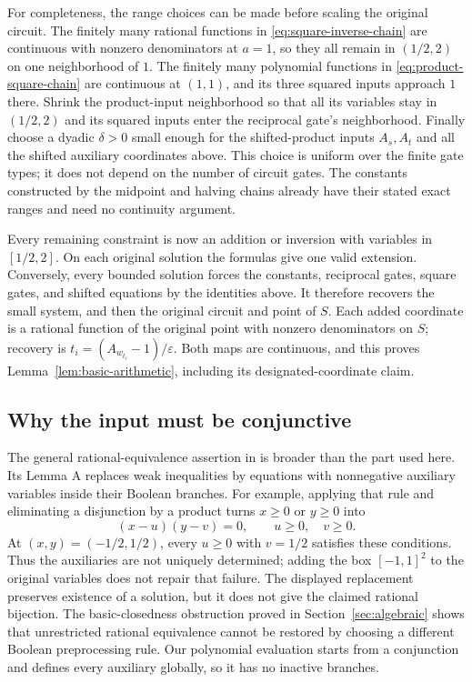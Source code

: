 For completeness, the range choices can be made before scaling the
original circuit. The finitely many rational functions in
\eqref{eq:square-inverse-chain} are continuous with nonzero denominators
at $a=1$, so they all remain in $(1/2,2)$ on one neighborhood of $1$.
The finitely many polynomial functions in
\eqref{eq:product-square-chain} are continuous at $(1,1)$, and its
three squared inputs approach $1$ there. Shrink the product-input
neighborhood so that all its variables stay in $(1/2,2)$ and its squared
inputs enter the reciprocal gate's neighborhood. Finally choose a dyadic
$\delta>0$ small enough for the shifted-product inputs $A_s,A_t$ and
all the shifted auxiliary coordinates above. This choice is uniform over
the finite gate types; it does not depend on the number of circuit gates.
The constants constructed by the midpoint and halving chains already
have their stated exact ranges and need no continuity argument.

Every remaining constraint is now an addition or inversion with variables
in $[1/2,2]$. On each original solution the formulas give one valid
extension. Conversely, every bounded solution forces the constants,
reciprocal gates, square gates, and shifted equations by the identities
above. It therefore recovers the small system, and then the original
circuit and point of $S$. Each added coordinate is a rational function
of the original point with nonzero denominators on $S$; recovery is
$t_i=(A_{w_{t_i}}-1)/\varepsilon$.
Both maps are continuous, and this proves
Lemma~\ref{lem:basic-arithmetic}, including its designated-coordinate claim.

\subsection{Why the input must be conjunctive}

The general rational-equivalence assertion in
\citet[Theorem 1]{AbrahamsenMiltzow2019} is broader than the part used
here. Its Lemma A replaces weak inequalities by equations with
nonnegative auxiliary variables inside their Boolean branches.
For example, applying that rule and eliminating a disjunction by a product
turns $x\ge0$ or $y\ge0$ into
\[
 (x-u)(y-v)=0,\qquad u\ge0,\quad v\ge0.
\]
At $(x,y)=(-1/2,1/2)$, every $u\ge0$ with $v=1/2$ satisfies these
conditions. Thus the auxiliaries are not uniquely determined; adding
the box $[-1,1]^2$ to the original variables does not repair that failure.
The displayed replacement preserves existence of a solution,
but it does not give the claimed rational bijection. The basic-closedness obstruction proved in
Section~\ref{sec:algebraic} shows that unrestricted rational equivalence
cannot be restored by choosing a different Boolean preprocessing rule.
Our polynomial evaluation starts from a conjunction and defines every
auxiliary globally, so it has no inactive branches.
